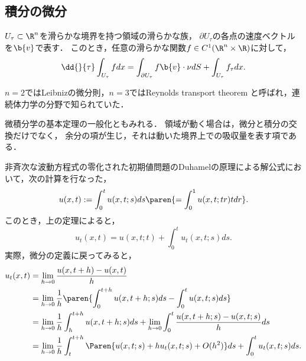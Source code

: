 \documentclass[uplatex,dvipdfmx]{jsreport}
\begin{document}
\subsection{積分の微分}

\begin{tcolorbox}[colframe=ForestGreen, colback=ForestGreen!10!white,breakable,colbacktitle=ForestGreen!40!white,coltitle=black,fonttitle=\bfseries\sffamily,
title=]
    
\end{tcolorbox}

\begin{theorem}\label{thm-differentiation-of-integral-on-moving-region}
    $U_\tau\subset\R^n$を滑らかな境界を持つ領域の滑らかな族，
    $\partial U_\tau$の各点の速度ベクトルを$\b{v}$で表す．
    このとき，任意の滑らかな関数$f\in C^1(\R^n\times\R)$に対して，
    \[\dd{}{\tau}\int_{U_\tau}fdx=\int_{\partial U_\tau}f\b{v}\cdot\nu dS+\int_{U_\tau}f_\tau dx.\]
\end{theorem}
\begin{history}
    $n=2$ではLeibnizの微分則，$n=3$ではReynolds transport theorem
    と呼ばれ，連続体力学の分野で知られていた．
\end{history}
\begin{remarks}[物理的直感の先行]
    微積分学の基本定理の一般化ともみれる．
    領域が動く場合は，微分と積分の交換だけでなく，
    余分の項が生じ，それは動いた境界上での吸収量を表す項である．
\end{remarks}

\begin{example}\label{exp-moving-region-appeared-in-N-C-WE}
    非斉次な波動方程式の零化された初期値問題のDuhamelの原理による解公式において，次の計算を行なった，
    \[u(x,t):=\int^t_0u(x,t;s)ds\paren{=\int^1_0u(x,t;tr)tdr}.\]
    このとき，上の定理によると，
    \[u_t(x,t)=u(x,t;t)+\int^t_0u_t(x,t;s)ds.\]
    実際，微分の定義に戻ってみると，
    \begin{align*}
        u_t(x,t)&=\lim_{h\to0}\frac{u(x,t+h)-u(x,t)}{h}\\
        &=\lim_{h\to0}\frac{1}{h}\paren{\int^{t+h}_0u(x,t+h;s)ds-\int^t_0u(x,t;s)ds}\\
        &=\lim_{h\to0}\frac{1}{h}\int^{t+h}_hu(x,t+h;s)ds+\lim_{h\to0}\int^t_0\frac{u(x,t+h;s)-u(x,t;s)}{h}ds\\
        &=\lim_{h\to0}\frac{1}{h}\int^{t+h}_t\Paren{u(x,t;s)+hu_t(x,t;s)+O(h^2)}ds+\int^t_0u_t(x,t;s)ds.
    \end{align*}
\end{example}
\end{document}
